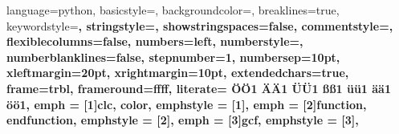 {
  language=python,	%
  basicstyle=\scriptsize\ttfamily,	%
  backgroundcolor=\color{white},		%
  breaklines=true,	%
  keywordstyle=\bfseries\ttfamily\color{blue},	%
  stringstyle=\ttfamily\color{Peach},			%
  showstringspaces=false,	%
  commentstyle=\color{ForestGreen}\ttfamily,	%
  flexiblecolumns=false,	%
  numbers=left,		%
  numberstyle=\tiny,	%
  numberblanklines=false,		%
  stepnumber=1,		%
  numbersep=10pt,		%
  xleftmargin=20pt,	%
  xrightmargin=10pt,	%
  extendedchars=true,	%
  frame=trbl,			%
  frameround=ffff,	%
  literate=		%
   {Ö}{{\"O}}1 
   {Ä}{{\"A}}1 
   {Ü}{{\"U}}1 
   {ß}{{\ss}}1 
   {ü}{{\"u}}1 
   {ä}{{\"a}}1 
   {ö}{{\"o}}1,
  emph = [1]{clc, color},
  emphstyle = [1]{\color{blue}},
  emph = [2]{function, endfunction},
  emphstyle = [2]{\color{BrickRed}},
  emph = [3]{gcf},
  emphstyle = [3]{\color{black}},
}

